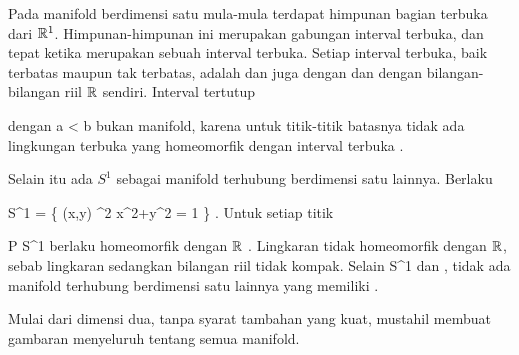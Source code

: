 {

Pada manifold berdimensi satu
mula-mula terdapat himpunan bagian terbuka dari ${\mathbb R}^1$. Himpunan-himpunan ini merupakan gabungan interval terbuka, dan  tepat ketika merupakan sebuah interval terbuka. Setiap interval terbuka, baik terbatas maupun tak terbatas, adalah
dan juga
dengan
\mathl{]0,1[}{} dan dengan bilangan-bilangan riil ${\mathbb R}$ sendiri. Interval tertutup

\mathbed {[a,b]} {dengan}
 {a < b} {}
 {} {} {} {}
bukan manifold, karena untuk titik-titik batasnya
 {} {}
tidak ada lingkungan terbuka yang homeomorfik dengan interval terbuka
 {} {.}

Selain itu ada  {}
 {} {}
$S^1$ sebagai manifold terhubung berdimensi satu lainnya. Berlaku

\mavergleichskettedisp
{\vergleichskette
{ S^1
}
{ =} { \left\{ (x,y) \in \R^2  \mid   x^2+y^2 = 1         \right\}
}
{ } {
}
{ } {
}
{ } {
}
}
{}{}{.}
Untuk setiap titik

\mavergleichskette
{\vergleichskette
{ P
}
{ \in }{ S^1
}
{  }{
}
{    }{
}
{   }{
}
}
{}{}{}
berlaku
 homeomorfik dengan ${\mathbb R}$
 {} {.}
Lingkaran tidak homeomorfik dengan ${\mathbb R}$, sebab lingkaran
sedangkan bilangan riil tidak kompak. Selain \mathkor {} {S^1} {dan} {\R} {}, tidak ada manifold terhubung berdimensi satu lainnya yang memiliki
 {} {.}

}
Mulai dari dimensi dua, tanpa syarat tambahan yang kuat, mustahil membuat gambaran menyeluruh tentang semua manifold.
